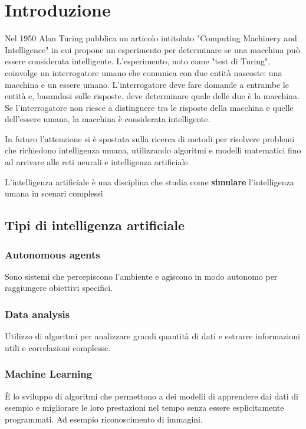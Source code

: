 \documentclass[a4paper]{article}
\begin{document}


\tableofcontents
\pagebreak

\section{Introduzione}
Nel 1950 Alan Turing pubblica un articolo intitolato "Computing Machinery and Intelligence" in cui propone
un esperimento per determinare se una macchina può essere considerata intelligente. L'esperimento, noto
come "test di Turing", coinvolge un interrogatore umano che comunica con due entità nascoste: una macchina
e un essere umano. L'interrogatore deve fare domande a entrambe le entità e, basandosi sulle risposte,
deve determinare quale delle due è la macchina. Se l'interrogatore non riesce a distinguere tra le risposte
della macchina e quelle dell'essere umano, la macchina è considerata intelligente.

\vspace{1em}
\noindent
In futuro l'attenzione si è spostata sulla ricerca di metodi per risolvere problemi che richiedono intelligenza
umana, utilizzando algoritmi e modelli matematici fino ad arrivare alle reti neurali e intelligenza artificiale.

\begin{definition}
  L'intelligenza artificiale è una disciplina che studia come \textbf{simulare} l'intelligenza umana in
  scenari complessi
\end{definition}

\subsection{Tipi di intelligenza artificiale}
\subsubsection{Autonomous agents}
Sono sistemi che percepiscono l'ambiente e agiscono in modo autonomo per raggiungere obiettivi specifici.

\subsubsection{Data analysis}
Utilizzo di algoritmi per analizzare grandi quantità di dati e estrarre informazioni utili e correlazioni
complesse.

\subsubsection{Machine Learning}
È lo sviluppo di algoritmi che permettono a dei modelli di apprendere dai dati
di esempio e migliorare le loro prestazioni nel tempo senza essere esplicitamente programmati.
Ad esempio riconoscimento di immagini.
\end{document}
